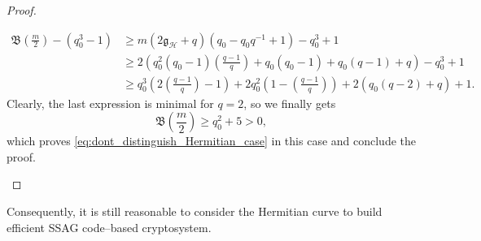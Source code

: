 \documentclass[a4paper]{article}
\theoremstyle{definition}
\theoremstyle{remark}
\newcommand{\calH}{\mathcal{H}}
\begin{document}
\begin{proof}
\begin{itemize}
        \begin{align*}
           \mathfrak{B}\left(\frac{m}{2}\right) - (q_0^3-1) 
           &\geq m(2\mathfrak{g}_{\calH}+q)(q_0-q_0q^{-1}+1)-q_0^3+1 \\ 
           &\geq 2\left(q_0^2(q_0-1)\left(\frac{q-1}{q}\right)+q_0(q_0-1)+q_0(q-1)+q\right)-q_0^3+1 \\
           & \geq q_0^3\left(2\left(\frac{q-1}{q}\right)-1\right) + 2q_0^2\left(1-\left(\frac{q-1}{q}\right)\right) + 2(q_0(q-2)+q)+1.
        \end{align*}
        Clearly, the last expression is minimal for $q=2$, so we finally gets
        $$\mathfrak{B}\left(\frac{m}{2}\right) \geq q_0^2 + 5 >0,$$
        which proves \eqref{eq:dont_distinguish_Hermitian_case} in this case and conclude the proof.
    \end{itemize}
\end{proof}
Consequently, it is still reasonable to consider the Hermitian curve to build efficient SSAG code--based cryptosystem.


\clearpage


\end{document}
